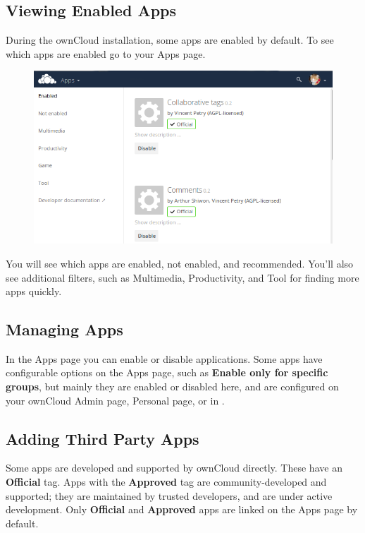 \documentclass[letterpaper,10pt,english]{sphinxmanual}
\begin{document}
\subsection{Viewing Enabled Apps}
\label{installation/apps_management_installation:viewing-enabled-apps}
During the ownCloud installation, some apps are enabled by default. To see which
apps are enabled go to your Apps page.
\begin{figure}[htbp]
\centering

\includegraphics{oc_admin_app_page.png}
\end{figure}

You will see which apps are enabled, not enabled, and recommended. You'll also
see additional filters, such as Multimedia, Productivity, and Tool for finding
more apps quickly.


\subsection{Managing Apps}
\label{installation/apps_management_installation:managing-apps}
In the Apps page you can enable or disable applications. Some apps have
configurable options on the Apps page, such as \textbf{Enable only for specific
groups}, but mainly they are enabled or disabled here, and are configured on
your ownCloud Admin page, Personal page, or in .


\subsection{Adding Third Party Apps}
\label{installation/apps_management_installation:adding-third-party-apps}
Some apps are developed and supported by ownCloud directly. These have an
\textbf{Official} tag. Apps with the \textbf{Approved} tag are community-developed and
supported; they are maintained by trusted developers, and are under active
development. Only \textbf{Official} and \textbf{Approved} apps are linked on the Apps
page by default.
\end{document}
